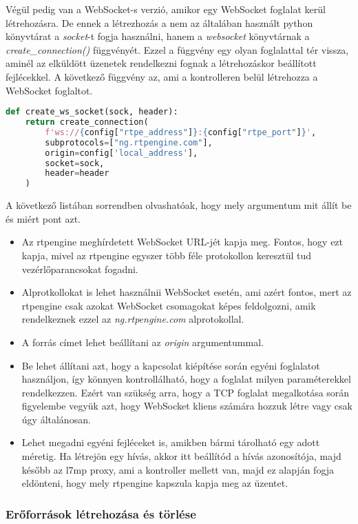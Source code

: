 Végül pedig van a WebSocket-s verzió, amikor egy WebSocket foglalat kerül létrehozásra.
De ennek a létrezhozás a nem az általában használt python könyvtárat a \textit{socket}-t
fogja használni, hanem a \textit{websocket} könyvtárnak a \textit{create\_connection()}
függvényét. Ezzel a függvény egy olyan foglalattal tér vissza, aminél az elküldött 
üzenetek rendelkezni fognak a létrehozáskor beállított fejlécekkel. A következő 
függvény az, ami a kontrolleren belül létrehozza a WebSocket foglaltot. 

\begin{lstlisting}[language=python]
def create_ws_socket(sock, header):
	return create_connection(
		f'ws://{config["rtpe_address"]}:{config["rtpe_port"]}',
		subprotocols=["ng.rtpengine.com"],
		origin=config['local_address'],
		socket=sock,
		header=header
	)
\end{lstlisting}

A következő listában sorrendben olvashatóak, hogy mely argumentum mit állít be és miért
pont azt.

\begin{itemize}
	\item Az rtpengine meghírdetett WebSocket URL-jét kapja meg. Fontos, hogy ezt
	kapja, mivel az rtpengine egyszer több féle protokollon keresztül tud 
	vezérlőparancsokat fogadni.
	\item Alprotkollokat is lehet használnii WebSocket esetén, ami azért fontos, mert
	az rtpengine csak azokat WebSocket csomagokat képes feldolgozni, amik rendelkeznek
	ezzel az \textit{ng.rtpengine.com} alprotokollal.
	\item A forrás címet lehet beállítani az \textit{origin} argumentummal. 
	\item Be lehet állítani azt, hogy a kapcsolat kiépítése során egyéni foglalatot
	használjon, így könnyen kontrollálható, hogy a foglalat milyen paraméterekkel 
	rendelkezzen. Ezért van szükség arra, hogy a TCP foglalat megalkotása során
	figyelembe vegyük azt, hogy WebSocket kliens számára hozzuk létre vagy csak úgy
	általánosan.
	\item Lehet megadni egyéni fejléceket is, amikben bármi tárolható egy adott
	méretig. Ha létrejön egy hívás, akkor itt beállítód a hívás azonosítója, majd 
	később az l7mp proxy, ami a kontroller mellett van, majd ez alapján fogja eldönteni,
	hogy mely rtpengine kapszula kapja meg az üzentet.
\end{itemize}

\subsubsection{Erőforrások létrehozása és törlése}

